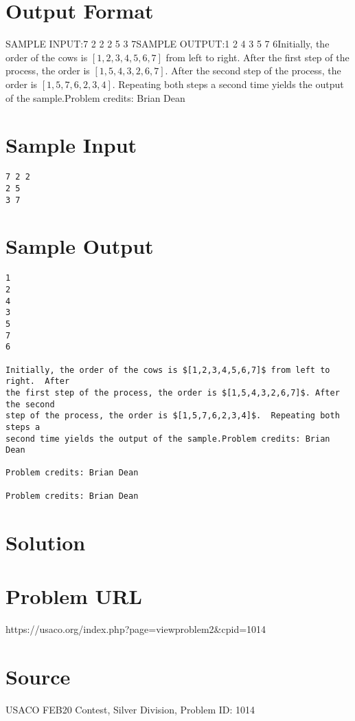 \documentclass[12pt]{article}
\begin{document}
\section*{Output Format}
SAMPLE INPUT:7 2 2
2 5
3 7SAMPLE OUTPUT:1
2
4
3
5
7
6Initially, the order of the cows is $[1,2,3,4,5,6,7]$ from left to right.  After
the first step of the process, the order is $[1,5,4,3,2,6,7]$. After the second
step of the process, the order is $[1,5,7,6,2,3,4]$.  Repeating both steps a
second time yields the output of the sample.Problem credits: Brian Dean

\section*{Sample Input}
\begin{verbatim}
7 2 2
2 5
3 7
\end{verbatim}

\section*{Sample Output}
\begin{verbatim}
1
2
4
3
5
7
6

Initially, the order of the cows is $[1,2,3,4,5,6,7]$ from left to right.  After
the first step of the process, the order is $[1,5,4,3,2,6,7]$. After the second
step of the process, the order is $[1,5,7,6,2,3,4]$.  Repeating both steps a
second time yields the output of the sample.Problem credits: Brian Dean

Problem credits: Brian Dean

Problem credits: Brian Dean
\end{verbatim}

\section*{Solution}


\section*{Problem URL}
https://usaco.org/index.php?page=viewproblem2&cpid=1014

\section*{Source}
USACO FEB20 Contest, Silver Division, Problem ID: 1014
\end{document}
